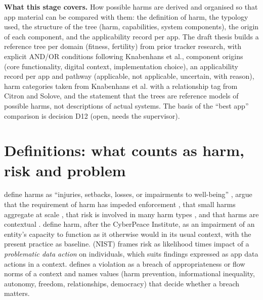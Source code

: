 
\noindent\textbf{What this stage covers.} How possible harms are derived and organised so that app material can be compared with them: the definition of harm, the typology used, the structure of the tree (harm, capabilities, system components), the origin of each component, and the applicability record per app. The draft thesis builds a reference tree per domain (fitness, fertility) from prior tracker research, with explicit AND/OR conditions following Knabenhans et al., component origins (core functionality, digital context, implementation choice), an applicability record per app and pathway (applicable, not applicable, uncertain, with reason), harm categories taken from Knabenhans et al. with a relationship tag from Citron and Solove, and the statement that the trees are reference models of possible harms, not descriptions of actual systems. The basis of the ``best app'' comparison is decision D12 (open, needs the supervisor).

\section{Definitions: what counts as harm, risk and problem}
 define harms as ``injuries, setbacks, losses, or impairments to well-being'' , argue that the requirement of harm has impeded enforcement , that small harms aggregate at scale , that risk is involved in many harm types , and that harms are contextual .  define harm, after the CyberPeace Institute, as an impairment of an entity's capacity to function as it otherwise would in its usual context, with the present practice as baseline.  (NIST) frames risk as likelihood times impact of a \emph{problematic data action} on individuals, which suits findings expressed as app data actions in a context.  defines a violation as a breach of appropriateness or flow norms of a context and names values (harm prevention, informational inequality, autonomy, freedom, relationships, democracy) that decide whether a breach matters.

